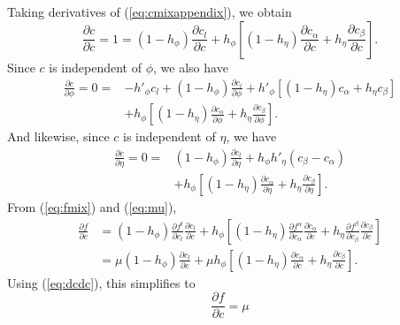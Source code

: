 Taking derivatives of (\ref{eq:cmixappendix}), we obtain
%
\begin{equation}
  \frac{\partial c}{\partial c} = 1 = 
  ( 1 - h_\phi ) \frac{\partial c_l}{\partial c} +
  h_\phi \left [
  ( 1 - h_\eta ) \frac{\partial c_\alpha}{\partial c} +
  h_\eta \frac{\partial c_\beta}{\partial c} \right].
\label{eq:dcdc}
\end{equation}
%
Since $c$ is independent of $\phi$, we also have
%
\begin{equation}
\begin{split}
  \frac{\partial c}{\partial \phi} = 0 = {}
  & - h'_\phi c_l + ( 1 - h_\phi ) \frac{\partial c_l}{\partial \phi}
  + h'_\phi \left [
  ( 1 - h_\eta ) c_\alpha + h_\eta c_\beta \right]
  \\ & + h_\phi \left [
  ( 1 - h_\eta ) \frac{\partial c_\alpha}{\partial \phi}
  + h_\eta \frac{\partial c_\beta}{\partial \phi} \right].
\label{eq:dcdphi}
\end{split}
\end{equation}
%
And likewise, since $c$ is independent of $\eta$, we have
\begin{equation}
\begin{split}
  \frac{\partial c}{\partial \eta} = 0 = {}
  & ( 1 - h_\phi ) \frac{\partial c_l}{\partial \eta}
  + h_\phi h'_\eta ( c_\beta - c_\alpha )
  \\ & + h_\phi \left [
  ( 1 - h_\eta ) \frac{\partial c_\alpha}{\partial \eta}
  + h_\eta \frac{\partial c_\beta}{\partial \eta} \right].
\label{eq:dcdeta}
\end{split}
\end{equation}
%
From (\ref{eq:fmix}) and (\ref{eq:mu}),
%
\begin{equation}
\begin{split}
  \frac{\partial f}{\partial c} & =
  ( 1 - h_\phi )
    \frac{\partial f^l}{\partial c_l}
    \frac{\partial c_l}{\partial c} +
  h_\phi \left[
    ( 1 - h_\eta )
    \frac{\partial f^\alpha}{\partial c_\alpha}
    \frac{\partial c_\alpha}{\partial c}
    + h_\eta
    \frac{\partial f^\beta}{\partial c_\beta}
    \frac{\partial c_\beta}{\partial c} \right]
  \\ & =
  \mu ( 1 - h_\phi )
    \frac{\partial c_l}{\partial c} +
  \mu h_\phi \left[
    ( 1 - h_\eta )
    \frac{\partial c_\alpha}{\partial c}
    + h_\eta \frac{\partial c_\beta}{\partial c} \right].
\end{split}
\end{equation}
%
Using (\ref{eq:dcdc}), this simplifies to
%
\begin{equation}
  \frac{\partial f}{\partial c} = \mu
\label{eq:dfdc}
\end{equation}
